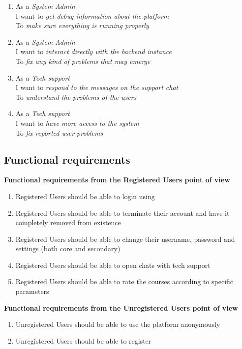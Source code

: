 \begin{enumerate}
	\item As a \textit{System Admin} \\
	I want to \textit{get debug information about the platform} \\
	To \textit{make sure everything is running properly}
	\item As a \textit{System Admin} \\
	I want to \textit{interact directly with the backend instance} \\
	To \textit{fix any kind of problems that may emerge}
	
	\item As a \textit{Tech support} \\
	I want to \textit{respond to the messages on the support chat} \\
	To \textit{understand the problems of the users}
	\item As a \textit{Tech support} \\
	I want to \textit{have more access to the system} \\
	To \textit{fix reported user problems}
\end{enumerate}

\subsection{Functional requirements}
\hfill\textbf{Functional requirements from the Registered Users point of view}
\begin{enumerate}[start=1,label={\bfseries FR \arabic*.}]
	\item Registered Users should be able to login using
	\item Registered Users should be able to terminate their account and have it completely removed from existence
	\item Registered Users should be able to change their username, password and settings (both core and secondary)
	\item Registered Users should be able to open chats with tech support
	\item Registered Users should be able to rate the courses according to specific parameters
\end{enumerate}

\textbf{Functional requirements from the Unregistered Users point of view}
\begin{enumerate}[start=6,label={\bfseries FR \arabic*.}]
	\item Unregistered Users should be able to use the platform anonymously
	\item Unregistered Users should be able to register
\end{enumerate}

